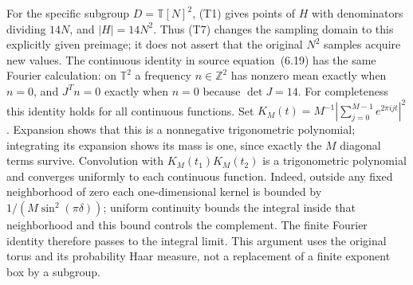For the specific subgroup $D=\mathbb T[N]^2$, (T1) gives points
of $H$ with denominators dividing $14N$, and $|H|=14N^2$.
Thus (T7) changes the sampling domain to this explicitly given
preimage; it does not assert that the original $N^2$ samples acquire
new values. The continuous identity in source equation~(6.19)
has the same Fourier calculation: on $\mathbb T^2$ a frequency
$n\in\mathbb Z^2$ has nonzero mean exactly when $n=0$, and
$J^Tn=0$ exactly when $n=0$ because $\det J=14$.
For completeness this identity holds for all continuous functions.
Set $K_M(t)=M^{-1}|\sum_{j=0}^{M-1}e^{2\pi ijt}|^2$.
Expansion shows that this is a nonnegative trigonometric polynomial;
integrating its expansion shows its mass is one, since exactly the
$M$ diagonal terms survive. Convolution with
$K_M(t_1)K_M(t_2)$ is a trigonometric polynomial and converges
uniformly to each continuous function. Indeed, outside any fixed
neighborhood of zero each one-dimensional kernel is bounded by
$1/(M\sin^2(\pi\delta))$; uniform continuity bounds the integral
inside that neighborhood and this bound controls the complement.
The finite Fourier identity therefore passes to the integral limit.
This argument uses the original torus and its probability Haar
measure, not a replacement of a finite exponent box by a subgroup.

